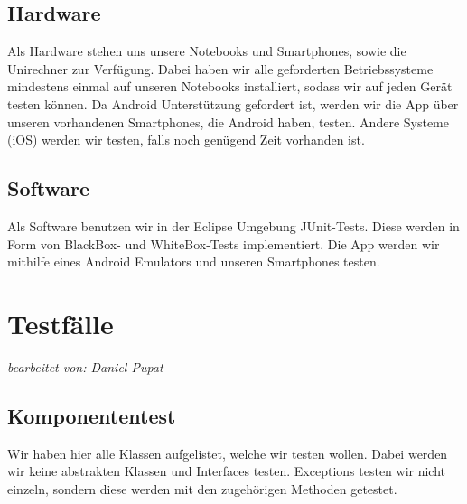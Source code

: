 \documentclass[fontsize=12pt,paper=a4,twoside]{scrartcl}
\begin{document}
\subsection{Hardware}

Als Hardware stehen uns unsere Notebooks und Smartphones, sowie die Unirechner zur Verfügung. Dabei haben wir alle geforderten Betriebssysteme mindestens einmal auf unseren Notebooks installiert, sodass wir auf jeden Gerät testen können. Da Android Unterstützung gefordert ist, werden wir die App über unseren vorhandenen Smartphones, die Android haben, testen. Andere Systeme (iOS) werden wir testen, falls noch genügend Zeit vorhanden ist.

\subsection{Software}

Als Software benutzen wir in der Eclipse Umgebung JUnit-Tests. Diese werden in Form von BlackBox- und WhiteBox-Tests implementiert. Die App werden wir mithilfe eines Android Emulators und unseren Smartphones testen.

\section{Testfälle}\label{c10}
\textit{bearbeitet von: Daniel Pupat }\\

\subsection{Komponententest}\label{c10-0}

Wir haben hier alle Klassen aufgelistet, welche wir testen wollen. Dabei werden wir keine abstrakten Klassen und Interfaces testen. Exceptions testen wir nicht einzeln, sondern diese werden mit den zugehörigen Methoden getestet.
\end{document}
